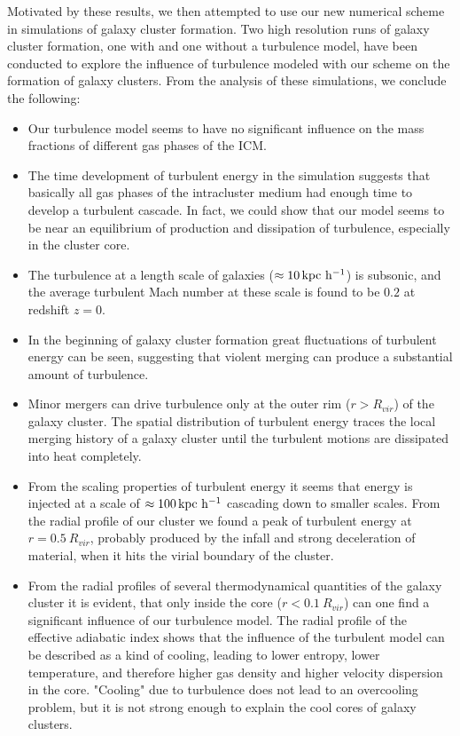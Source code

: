 Motivated by these results, we then attempted to use our new numerical scheme in
 simulations of galaxy cluster formation. Two high resolution runs of galaxy
cluster formation, one with and one without a turbulence model, have been
conducted to explore the influence of
turbulence modeled with our scheme on the formation of galaxy clusters. From
the analysis of these simulations, we conclude the following:
\begin{itemize}
\item Our turbulence model seems to have no significant influence on the mass
fractions of different gas phases of the ICM. 
\item The time development of turbulent energy in the simulation suggests that
basically all gas phases of the intracluster medium had enough time to develop
a turbulent cascade. In fact, we could show that our model seems to be near an
equilibrium of production and dissipation of turbulence, especially in the
cluster core. 
\item The turbulence at a length scale of galaxies 
($\approx \unit[10]{kpc\ h^{-1}}$) is subsonic, and the average
turbulent Mach number at these scale is found to be $0.2$ at redshift $z=0$. 
\item In the beginning of galaxy cluster formation great fluctuations of
turbulent energy can be seen, suggesting that violent merging can produce a
substantial amount of turbulence. 
\item Minor mergers can drive turbulence only at the outer rim 
($r>R_{vir}$) of the galaxy cluster. The spatial distribution of turbulent
energy traces the local merging history of a galaxy cluster until the turbulent
motions are dissipated into heat completely. 
\item From the scaling properties of turbulent energy it seems that energy
is injected at a scale of $\approx \unit[100]{kpc\ h^{-1}}$ cascading down to
smaller scales. From the radial profile of our cluster we found a peak of
turbulent energy at $r=0.5\ R_{vir}$, probably produced by the infall and 
strong deceleration of material, when it hits the virial boundary of the
cluster.
\item From the radial profiles of several thermodynamical quantities of the
galaxy cluster it is evident, that only inside the core ($r<0.1\ R_{vir}$)
can one find a significant influence of our turbulence model. The radial profile
of
the effective adiabatic index shows that the influence of the turbulent model
can be described as a kind of cooling, leading to lower entropy, lower
temperature, and therefore higher gas density and higher velocity dispersion in
the core. "Cooling" due to turbulence does not lead to an overcooling
problem, but it is not strong enough to explain the cool cores of galaxy
clusters.
\end{itemize}

